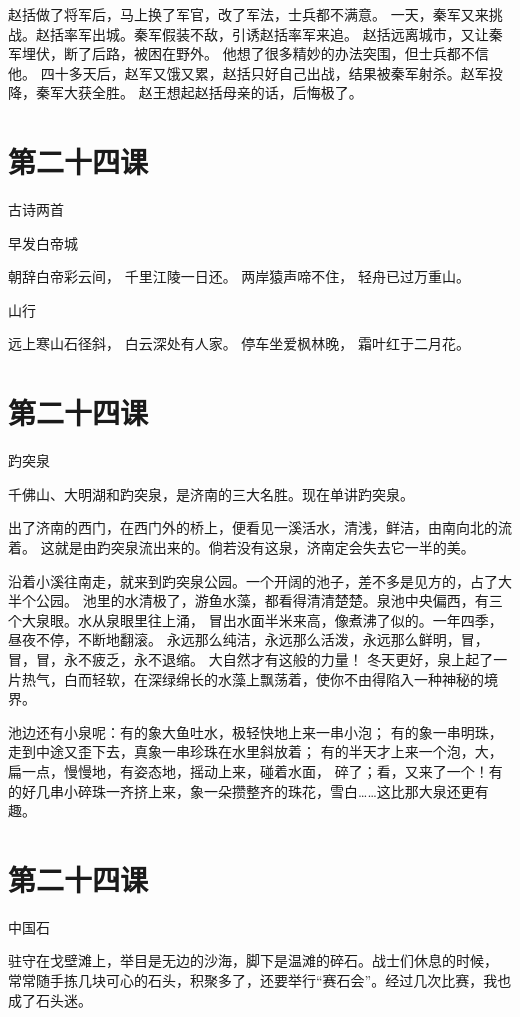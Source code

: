 \documentclass[12pt,UTF8]{ctexbook}
\begin{document}
赵括做了将军后，马上换了军官，改了军法，士兵都不满意。
一天，秦军又来挑战。赵括率军出城。秦军假装不敌，引诱赵括率军来追。
赵括远离城市，又让秦军埋伏，断了后路，被困在野外。
他想了很多精妙的办法突围，但士兵都不信他。
四十多天后，赵军又饿又累，赵括只好自己出战，结果被秦军射杀。赵军投降，秦军大获全胜。
赵王想起赵括母亲的话，后悔极了。

\section{第二十四课}

古诗两首

早发白帝城

朝辞白帝彩云间，
千里江陵一日还。
两岸猿声啼不住，
轻舟已过万重山。

山行

远上寒山石径斜，
白云深处有人家。
停车坐爱枫林晚，
霜叶红于二月花。

\section{第二十四课}

趵突泉

千佛山、大明湖和趵突泉，是济南的三大名胜。现在单讲趵突泉。

出了济南的西门，在西门外的桥上，便看见一溪活水，清浅，鲜洁，由南向北的流着。
这就是由趵突泉流出来的。倘若没有这泉，济南定会失去它一半的美。

沿着小溪往南走，就来到趵突泉公园。一个开阔的池子，差不多是见方的，占了大半个公园。
池里的水清极了，游鱼水藻，都看得清清楚楚。泉池中央偏西，有三个大泉眼。水从泉眼里往上涌，
冒出水面半米来高，像煮沸了似的。一年四季，昼夜不停，不断地翻滚。
永远那么纯洁，永远那么活泼，永远那么鲜明，冒，冒，冒，永不疲乏，永不退缩。
大自然才有这般的力量！
冬天更好，泉上起了一片热气，白而轻软，在深绿绵长的水藻上飘荡着，使你不由得陷入一种神秘的境界。

池边还有小泉呢：有的象大鱼吐水，极轻快地上来一串小泡；
有的象一串明珠，走到中途又歪下去，真象一串珍珠在水里斜放着；
有的半天才上来一个泡，大，扁一点，慢慢地，有姿态地，摇动上来，碰着水面，
碎了；看，又来了一个！有的好几串小碎珠一齐挤上来，象一朵攒整齐的珠花，雪白……这比那大泉还更有趣。

\section{第二十四课}

中国石

驻守在戈壁滩上，举目是无边的沙海，脚下是温滩的碎石。战士们休息的时候，
常常随手拣几块可心的石头，积聚多了，还要举行“赛石会”。经过几次比赛，我也成了石头迷。
\end{document}
